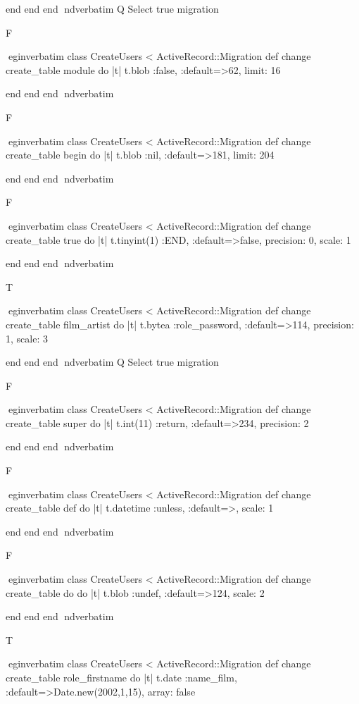     end 
  end 
end
nd{verbatim}
Q
 Select true migration

F

egin{verbatim}
 class CreateUsers < ActiveRecord::Migration 
  def change 
    create_table module do |t| 
      t.blob :false, :default=>62, limit: 16
    
    end 
  end 
end
nd{verbatim}

F

egin{verbatim}
 class CreateUsers < ActiveRecord::Migration 
  def change 
    create_table begin do |t| 
      t.blob :nil, :default=>181, limit: 204
    
    end 
  end 
end
nd{verbatim}

F

egin{verbatim}
 class CreateUsers < ActiveRecord::Migration 
  def change 
    create_table true do |t| 
      t.tinyint(1) :END, :default=>false, precision: 0, scale: 1
    
    end 
  end 
end
nd{verbatim}

T

egin{verbatim}
 class CreateUsers < ActiveRecord::Migration 
  def change 
    create_table film_artist do |t| 
      t.bytea :role_password, :default=>114, precision: 1, scale: 3
    
    end 
  end 
end
nd{verbatim}
Q
 Select true migration

F

egin{verbatim}
 class CreateUsers < ActiveRecord::Migration 
  def change 
    create_table super do |t| 
      t.int(11) :return, :default=>234, precision: 2
    
    end 
  end 
end
nd{verbatim}

F

egin{verbatim}
 class CreateUsers < ActiveRecord::Migration 
  def change 
    create_table def do |t| 
      t.datetime :unless, :default=>, scale: 1
    
    end 
  end 
end
nd{verbatim}

F

egin{verbatim}
 class CreateUsers < ActiveRecord::Migration 
  def change 
    create_table do do |t| 
      t.blob :undef, :default=>124, scale: 2
    
    end 
  end 
end
nd{verbatim}

T

egin{verbatim}
 class CreateUsers < ActiveRecord::Migration 
  def change 
    create_table role_firstname do |t| 
      t.date :name_film, :default=>Date.new(2002,1,15), array: false
    
